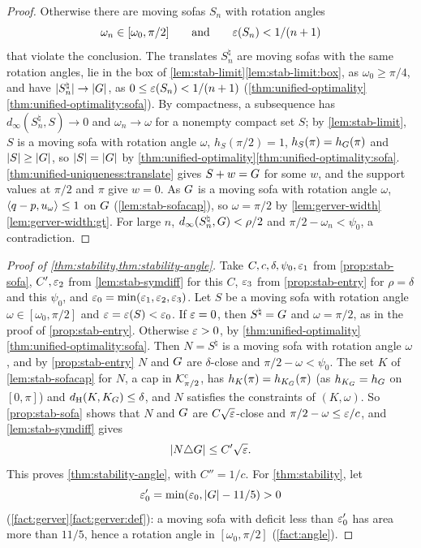 \begin{proof}
Otherwise there are moving sofas $S_n$ with rotation angles
\[
  \omega_n\in[\omega_0,\pi/2]\qquad\text{and}\qquad\varepsilon(S_n)<1/(n+1)
\]
that violate the conclusion. The translates $S_n^\natural$ are moving sofas
with the same rotation angles, lie in the box of
\cref{lem:stab-limit}\ref{lem:stab-limit:box}, as $\omega_0\ge\pi/4$, and have
$\lvert S_n^\natural\rvert\to\lvert G\rvert$, as $0\le\varepsilon(S_n)<1/(n+1)$
(\cref{thm:unified-optimality}\ref{thm:unified-optimality:sofa}). By
compactness, a subsequence has
$d_\infty(S^\natural_n,S)\to0$ and $\omega_n\to\omega$ for a nonempty compact
set $S$; by \cref{lem:stab-limit}, $S$ is a moving sofa with rotation angle
$\omega$, $h_S(\pi/2)=1$, $h_S(\pi)=h_G(\pi)$ and $\lvert S\rvert\ge\lvert G\rvert$, so
$\lvert S\rvert=\lvert G\rvert$ by
\cref{thm:unified-optimality}\ref{thm:unified-optimality:sofa}.
\ref{thm:unified-uniqueness:translate} gives
$S+w=G$ for some $w$, and the support values at $\pi/2$ and $\pi$ give
$w=0$. As $G$ is a moving sofa with rotation angle $\omega$,
$\langle q-p,u_\omega\rangle\le1$ on $G$ (\cref{lem:stab-sofacap}), so
$\omega=\pi/2$ by \cref{lem:gerver-width}\ref{lem:gerver-width:gt}. For large
$n$, $d_\infty(S_n^\natural,G)<\rho/2$ and $\pi/2-\omega_n<\psi_0$, a
contradiction.
\end{proof}

\begin{proof}[Proof of \cref{thm:stability,thm:stability-angle}]
Take $C,c,\delta,\psi_0,\varepsilon_1$ from \cref{prop:stab-sofa}, $C',\varepsilon_2$ from
\cref{lem:stab-symdiff} for this $C$, $\varepsilon_3$ from \cref{prop:stab-entry} for
$\rho=\delta$ and this $\psi_0$, and $\varepsilon_0=\min(\varepsilon_1,\varepsilon_2,\varepsilon_3)$. Let
$S$ be a moving sofa with rotation angle $\omega\in[\omega_0,\pi/2]$ and
$\varepsilon=\varepsilon(S)<\varepsilon_0$. If $\varepsilon=0$, then $S^\natural=G$ and $\omega=\pi/2$,
as in the proof of \cref{prop:stab-entry}. Otherwise $\varepsilon>0$, by
\cref{thm:unified-optimality}\ref{thm:unified-optimality:sofa}. Then
$N=S^\natural$ is a moving sofa with rotation angle $\omega$, and by
\cref{prop:stab-entry} $N$
and $G$ are $\delta$-close and $\pi/2-\omega<\psi_0$. The set $K$ of
\cref{lem:stab-sofacap} for $N$, a cap in $\mathcal{K}^{\mathrm{c}}_{\pi/2}$, has
$h_K(\pi)=h_{K_G}(\pi)$ (as $h_{K_G}=h_G$ on $[0,\pi]$) and
$d_{\mathrm{H}}(K,K_G)\le\delta$, and $N$ satisfies the constraints of $(K,\omega)$. So
\cref{prop:stab-sofa} shows that $N$ and $G$ are $C\sqrt{\varepsilon}$-close and
$\pi/2-\omega\le\varepsilon/c$, and \cref{lem:stab-symdiff} gives
\[
  \lvert N\triangle G\rvert\le C'\sqrt{\varepsilon}.
\]
This proves \cref{thm:stability-angle}, with $C''=1/c$. For
\cref{thm:stability}, let
\[
  \varepsilon_0'=\min(\varepsilon_0,\lvert G\rvert-11/5)>0
\]
(\cref{fact:gerver}\ref{fact:gerver:def}): a moving sofa with deficit less
than $\varepsilon_0'$ has area more than $11/5$, hence a rotation angle in
$[\omega_0,\pi/2]$ (\cref{fact:angle}).
\end{proof}

